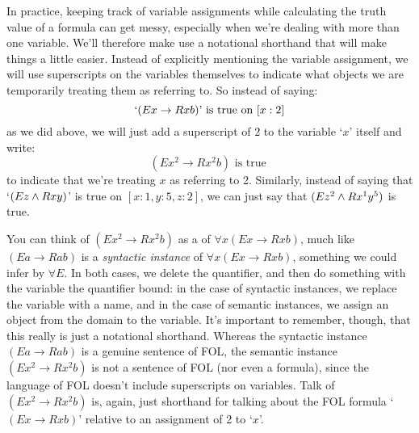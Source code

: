 In practice, keeping track of variable assignments while calculating the truth value of a formula can get messy, especially when we're dealing with more than one variable.  We'll therefore make use a notational shorthand that will make things a little easier.  Instead of explicitly mentioning the variable assignment, we will use superscripts on the variables themselves to indicate what objects we are temporarily treating them as referring to.  So instead of saying:
$$`(Ex \rightarrow Rxb) \text{' is true on } [x:2]$$
as we did above, we will just add a superscript of $2$ to the variable `$x$' itself and write:
$$(Ex^2 \rightarrow Rx^2b) \text{ is true }$$
to indicate that we're treating $x$ as referring to 2.  Similarly, instead of saying that `$(Ez \wedge Rxy)$' is true on $[x: 1, y:5, z:2]$, we can just say that $(Ez^2 \wedge Rx^1y^5)$ is true.

You can think of $(Ex^2 \rightarrow Rx^2b)$ as a  of $\forall x(Ex \rightarrow Rxb)$, much like $(Ea \rightarrow Rab)$ is a \emph{syntactic instance} of $\forall x(Ex \rightarrow Rxb)$, something we could infer by $\forall E$.  In both cases, we delete the quantifier, and then do something with the variable the quantifier bound: in the case of syntactic instances, we replace the variable with a name, and in the case of semantic instances, we assign an object from the domain to the variable.  
It's important to remember, though, that this really is just a notational shorthand.  Whereas the syntactic instance $(Ea \rightarrow Rab)$ is a genuine sentence of FOL, the semantic instance $(Ex^2 \rightarrow Rx^2b)$ is not a sentence of FOL (nor even a formula), since the language of FOL doesn't include superscripts on variables.  Talk of $(Ex^2 \rightarrow Rx^2b)$ is, again, just shorthand for talking about the FOL formula `$(Ex \rightarrow Rxb)$' relative to an assignment of 2 to `$x$'.

